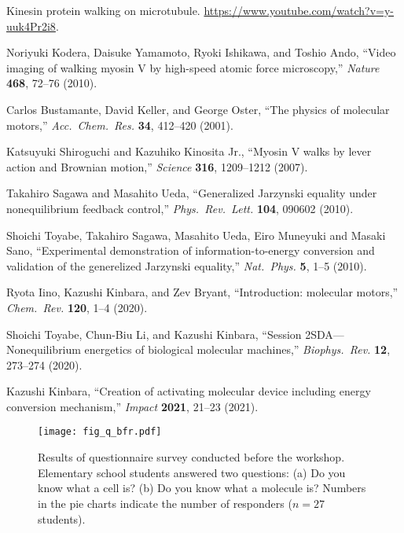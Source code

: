 \documentclass[10pt, aps, prb, preprint, longbibliography, superscriptaddress]{revtex4-2}
\begin{document}
\begin{thebibliography}{99}

	Kinesin protein walking on microtubule.
	\url{https://www.youtube.com/watch?v=y-uuk4Pr2i8}.

	Noriyuki Kodera, Daisuke Yamamoto, Ryoki Ishikawa, and Toshio Ando,
	``Video imaging of walking myosin V by high-speed atomic force microscopy,''
	\textit{Nature} \textbf{468}, 72--76 (2010).

	Carlos Bustamante, David Keller, and George Oster,
	``The physics of molecular motors,''
	\textit{Acc.~Chem.~Res.} \textbf{34}, 412--420 (2001).

	Katsuyuki Shiroguchi and Kazuhiko Kinosita Jr.,
	``Myosin V walks by lever action and Brownian motion,''
	\textit{Science} \textbf{316}, 1209--1212 (2007).

	Takahiro Sagawa and Masahito Ueda,
	``Generalized Jarzynski equality under nonequilibrium feedback control,''
	\textit{Phys.~Rev.~Lett.} \textbf{104}, 090602 (2010).

	Shoichi Toyabe, Takahiro Sagawa, Masahito Ueda, Eiro Muneyuki and Masaki Sano,
	``Experimental demonstration of information-to-energy conversion and validation of
	the generelized Jarzynski equality,''
	\textit{Nat.~Phys.} \textbf{5}, 1--5 (2010).

	Ryota Iino, Kazushi Kinbara, and Zev Bryant,
	``Introduction: molecular motors,''
	\textit{Chem.~Rev.} \textbf{120}, 1--4 (2020).

	Shoichi Toyabe, Chun-Biu Li, and Kazushi Kinbara,
	``Session 2SDA—Nonequilibrium energetics of biological molecular machines,''
 	\textit{Biophys.~Rev.} \textbf{12}, 273--274 (2020).

	Kazushi Kinbara,
	``Creation of activating molecular device including energy conversion mechanism,''
	\textit{Impact} \textbf{2021}, 21--23 (2021).

\end{thebibliography}

\clearpage

\begin{figure}
	\texttt{[image: fig\_q\_bfr.pdf]}
	\caption{Results of questionnaire survey conducted before the workshop.
	Elementary school students answered two questions:
	(a) Do you know what a cell is?
	(b) Do you know what a molecule is?
	Numbers in the pie charts indicate the number of responders ($n = 27$ students).}
	\label{fig_q_bfr}
\end{figure}
\end{document}
